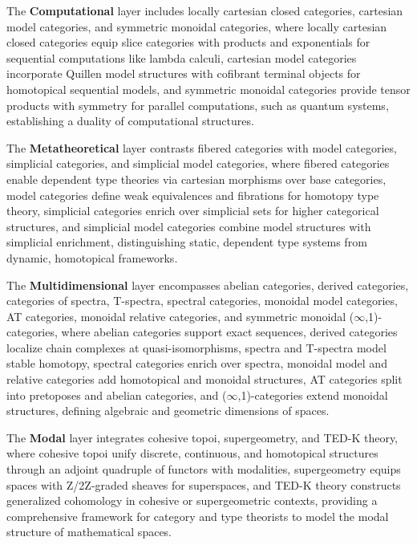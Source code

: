 \documentclass{article}
\begin{document}
The {\bf Computational} layer includes locally cartesian closed categories, cartesian model categories, and symmetric monoidal categories, where locally cartesian closed categories equip slice categories with products and exponentials for sequential computations like lambda calculi, cartesian model categories incorporate Quillen model structures with cofibrant terminal objects for homotopical sequential models, and symmetric monoidal categories provide tensor products with symmetry for parallel computations, such as quantum systems, establishing a duality of computational structures.

The {\bf Metatheoretical} layer contrasts fibered categories with model categories, simplicial categories, and simplicial model categories, where fibered categories enable dependent type theories via cartesian morphisms over base categories, model categories define weak equivalences and fibrations for homotopy type theory, simplicial categories enrich over simplicial sets for higher categorical structures, and simplicial model categories combine model structures with simplicial enrichment, distinguishing static, dependent type systems from dynamic, homotopical frameworks.

The {\bf Multidimensional} layer encompasses abelian categories, derived categories, categories of spectra, T-spectra, spectral categories, monoidal model categories, AT categories, monoidal relative categories, and symmetric monoidal ($\infty$,1)-categories, where abelian categories support exact sequences, derived categories localize chain complexes at quasi-isomorphisms, spectra and T-spectra model stable homotopy, spectral categories enrich over spectra, monoidal model and relative categories add homotopical and monoidal structures, AT categories split into pretoposes and abelian categories, and ($\infty$,1)-categories extend monoidal structures, defining algebraic and geometric dimensions of spaces.

The {\bf Modal} layer integrates cohesive topoi, supergeometry, and TED-K theory, where cohesive topoi unify discrete, continuous, and homotopical structures through an adjoint quadruple of functors with modalities, supergeometry equips spaces with Z/2Z-graded sheaves for superspaces, and TED-K theory constructs generalized cohomology in cohesive or supergeometric contexts, providing a comprehensive framework for category and type theorists to model the modal structure of mathematical spaces.

\end{document}
